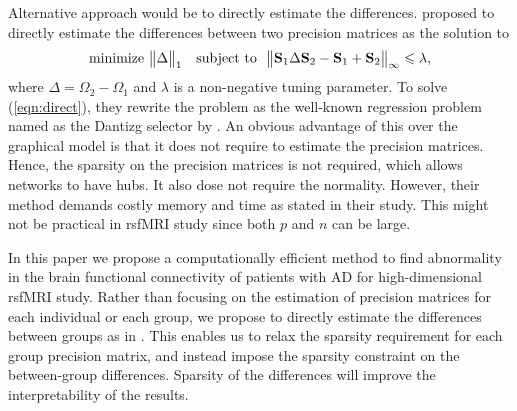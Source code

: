 \documentclass[useAMS,usenatbib,referee]{bio}
\begin{document}
Alternative approach would be to directly estimate the differences.  \citet{Zhao:2014} proposed to directly estimate the differences between two precision matrices as the solution to
\begin{equation} \label{eqn:direct} 
\mbox{minimize }  \big\| \Delta\big\|_1 \quad 
\mbox{subject to} ~~ \big\| {\bf S}_1 \Delta {\bf S}_2 -  {\bf S}_1 + {\bf S}_2 \big\|_{\infty} \le \lambda,
\end{equation} 
where $\Delta = \Omega_2-\Omega_1$ and $\lambda$ is a non-negative tuning parameter. 
To solve (\ref{eqn:direct}), they rewrite the problem as the well-known regression problem named as the Dantizg selector by \citet{Candes:2005}.
An obvious advantage of this over the graphical model is that it does not require to estimate the precision matrices. Hence, the sparsity on the precision matrices is not required, which allows networks to have hubs. It also dose not require the normality. However, their method demands costly memory and time as stated in their study. This might not be practical in rsfMRI study since both $p$ and $n$ can be large.

In this paper we propose a computationally efficient method to find abnormality in the brain functional connectivity of patients with AD for high-dimensional rsfMRI study.
Rather than focusing on the estimation of precision matrices for each individual or each group, we propose to directly estimate the differences between groups as in \citet{Zhao:2014}. This enables us to relax the sparsity requirement for each group precision matrix, and instead impose the sparsity constraint on the between-group differences. Sparsity of the differences will improve the interpretability of the results.
\end{document}
